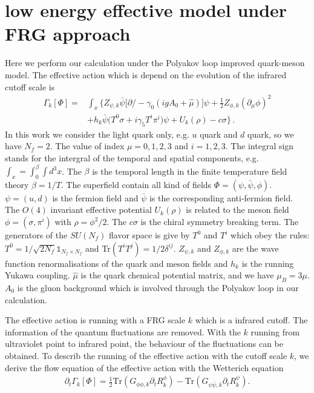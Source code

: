 \documentclass[%
reprint,
superscriptaddress,
showpacs,preprintnumbers,
 amsmath,amssymb,
 aps,
prd,
]{revtex4-1}
\begin{document}
\section{low energy effective model under FRG approach}
\label{sec:LEE}
Here we perform our calculation under the Polyakov loop improved quark-meson model. The effective action which is depend on the evolution of the infrared cutoff scale is
\begin{align}
  \Gamma_k[\Phi]=&\int_x \bigg\{Z_{\psi,k}\bar{\psi} \Big [\partial\!\!\!/ -\gamma_0(igA_0+\hat{\mu}) \Big ]\psi+\frac{1}{2}Z_{\phi,k}(\partial_\mu \phi)^2 \nonumber\\[2ex]
  &+h_k\bar{\psi}\big(T^0\sigma+i\gamma_5 T^i\pi^i\big)\psi+U_k(\rho)-c\sigma \bigg\}\,.
\label{eq:action}
\end{align}
In this work we consider the light quark only, e.g. $u$ quark and $d$ quark, so we have $N_f=2$. The value of index $\mu=0,1,2,3$ and $i=1,2,3$. The integral sign stands for the intergral of the temporal and spatial components, e.g. $\int_x=\int^\beta_0 \int d^3x$. The $\beta$ is the temporal length in the finite temperature field theory $\beta=1/T$. The superfield contain all kind of fields $\Phi=(\psi,\bar{\psi},\phi)$. $\psi=(u,d)$ is the fermion field and $\bar{\psi}$ is the corresponding anti-fermion field. The $O(4)$ invariant effective potential $U_k(\rho)$ is related to the meson field $\phi=(\sigma,\pi^i)$ with $\rho=\phi^2/2$. The $c\sigma$ is the chiral symmetry breaking term. The generators of the $SU(N_f)$ flavor space is give by $T^0$ and $T^i$ which obey the rules:$T^0=1/\sqrt{2N_f}\mathbb{1}_{N_f\times N_f}$ and Tr$(T^iT^j)=1/2\delta^{ij}$. $Z_{\psi,k}$ and $Z_{\phi,k}$ are the wave function renormalisations of the quark and meson fields and $h_k$ is the  running Yukawa coupling. $\hat{\mu}$ is the quark chemical potential matrix, and we have $\mu_B=3\mu$. $A_0$ is the gluon background which is involved through the Polyakov loop in our calculation.\par
The effective action is running with a FRG scale $k$ which is a infrared cutoff. The information of the quantum fluctuations are removed. With the $k$ running from ultraviolet point to infrared point, the behaviour of the fluctuations can be obtained. To describ the running of the effective action with the cutoff scale $k$, we derive the flow equation of the effective action with the Wetterich equation
\begin{align}
\partial_t\Gamma_k[\Phi]=\frac{1}{2}\mathrm{Tr}(G_{\phi\phi,k}\partial_t R^\phi_k)-\mathrm{Tr}(G_{\psi\bar{\psi},k}\partial_t R^\psi_k).\label{eq:floweq}
\end{align}
\end{document}
